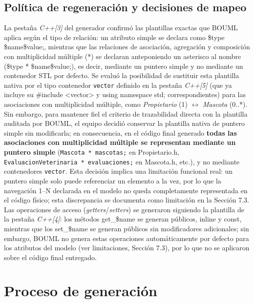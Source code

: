 \documentclass[journal,onecolumn]{IEEEtran}
\begin{document}
	\subsection{Política de regeneración y decisiones de mapeo}
	La pestaña \textit{C++[3]} del generador confirmó las plantillas exactas que BOUML aplica según el tipo de relación: un atributo simple se declara como \${type} \${name}\${value};, mientras que las relaciones de asociación, agregación y composición con multiplicidad múltiple (*) se declaran anteponiendo un asterisco al nombre (\${type} * \${name}\${value};), es decir, mediante un puntero simple y no mediante un contenedor STL por defecto. Se evaluó la posibilidad de sustituir esta plantilla nativa por el tipo contenedor \texttt{vector} definido en la pestaña \textit{C++[5]} (que ya incluye su \#include <vector> y using namespace std; correspondientes) para las asociaciones con multiplicidad múltiple, como \textit{Propietario} (1) $\leftrightarrow$ \textit{Mascota} (0..*). Sin embargo, para mantener fiel el criterio de trazabilidad directa con la plantilla auditada por BOUML, el equipo decidió conservar la plantilla nativa de puntero simple sin modificarla; en consecuencia, en el código final generado \textbf{todas las asociaciones con multiplicidad múltiple se representan mediante un puntero simple} (\texttt{Mascota * mascotas;} en Propietario.h, \texttt{EvaluacionVeterinaria * evaluaciones;} en Mascota.h, etc.), y no mediante contenedores \texttt{vector}. Esta decisión implica una limitación funcional real: un puntero simple solo puede referenciar un elemento a la vez, por lo que la navegación 1--N declarada en el modelo no queda completamente representada en el código físico; esta discrepancia se documenta como limitación en la Sección 7.3. Las operaciones de acceso (\textit{getters}/\textit{setters}) se generaron siguiendo la plantilla de la pestaña \textit{C++[4]}: los métodos get\_\${name} se generan públicos, inline y const, mientras que los set\_\${name} se generan públicos sin modificadores adicionales; sin embargo, BOUML no genera estas operaciones automáticamente por defecto para los atributos del modelo (ver limitaciones, Sección 7.3), por lo que no se aplicaron sobre el código final entregado.
	
	\section{Proceso de generación}
	
\end{document}
